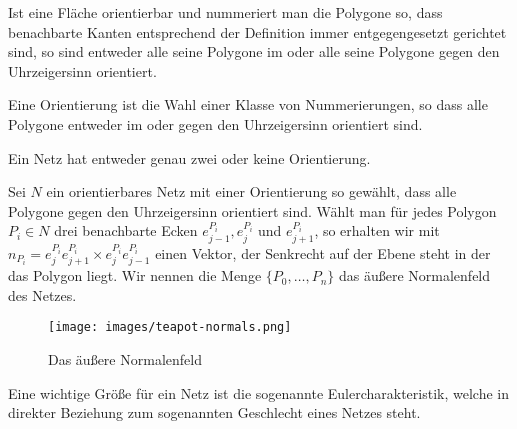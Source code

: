 \begin{Bemerkung}
Ist eine Fläche orientierbar und nummeriert man die Polygone so, dass benachbarte Kanten entsprechend der Definition immer entgegengesetzt gerichtet sind, so sind entweder alle seine Polygone im oder alle seine Polygone gegen den Uhrzeigersinn orientiert.
\end{Bemerkung}

\begin{figure}[H]\centering
    \hspace*{0.1\textwidth}
\end{figure}

\begin{Definition}
Eine Orientierung ist die Wahl einer Klasse von Nummerierungen, so dass alle Polygone entweder im oder gegen den Uhrzeigersinn orientiert sind.
\end{Definition}

\begin{Bemerkung}
Ein Netz hat entweder genau zwei oder keine Orientierung.  
\end{Bemerkung}


\begin{Definition}
Sei $N$ ein orientierbares Netz mit einer Orientierung so gewählt, dass  alle Polygone gegen den Uhrzeigersinn orientiert sind. Wählt man für jedes Polygon $P_i \in N$ drei benachbarte Ecken $e_{j-1}^{P_i}, e_{j}^{P_i}$ und $e_{j+1}^{P_i}$, so erhalten wir
mit $n_{P_i} = e_{j}^{P_i}e_{j+1}^{P_i} \times e_{j}^{P_i}e_{j-1}^{P_i}$ einen Vektor, der Senkrecht auf der Ebene steht in der das Polygon liegt. Wir nennen die Menge $\{P_0, \hdots, P_n\}$ das äußere Normalenfeld des Netzes. 
\end{Definition}


\begin{figure}[H]
    \centering
    \texttt{[image: images/teapot-normals.png]}
    \caption{Das äußere Normalenfeld}
    \label{fig:outer-normals}
\end{figure}
Eine wichtige Größe für ein Netz ist die sogenannte Eulercharakteristik, welche in direkter Beziehung zum sogenannten Geschlecht eines Netzes steht.

